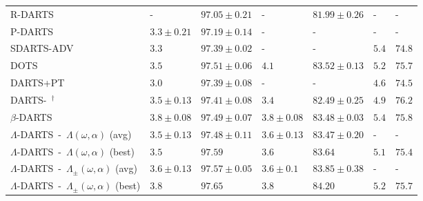 \documentclass{article} \usepackage{fancyhdr, iclr2023_conference, times}
\newcommand{\mydarts}{$\Lambda$-DARTS\xspace}
\begin{document}
\begin{table}[t]
\begin{center}
{\begin{tabular}{l l l l l l l}
\hline
R-DARTS~\citep{DBLP:conf/iclr/ZelaESMBH20} & - & $97.05\pm 0.21$ & - & $81.99\pm 0.26$ & - & - \\
P-DARTS~\citep{DBLP:conf/eccv/LiuZNSHLFYHM18} & $3.3\pm 0.21$ & $97.19\pm 0.14$ & - & - & - & - \\
SDARTS-ADV~\citep{DBLP:conf/icml/ChenH20} & $3.3$ & $97.39\pm 0.02$ & - & - & $5.4$ & $74.8$ \\
DOTS~\citep{DBLP:conf/cvpr/GuW0YWLC21} & $3.5$ & $\mathbf{97.51\pm 0.06}$ & $4.1$ & $\mathbf{83.52\pm 0.13}$ & $5.2$ & $75.7$ \\
DARTS+PT~\citep{DBLP:conf/iclr/WangCCTH21} & $3.0$ & $97.39\pm 0.08$ & - & - & $4.6$ & $74.5$ \\
DARTS-~\citep{DBLP:conf/iclr/ChuW0LWY21}$^\dagger$ & $3.5\pm0.13$ & $97.41\pm 0.08$ & $3.4$ & $82.49\pm 0.25$ & $4.9$ & $\mathbf{76.2}$ \\
$\beta$-DARTS~\citep{DBLP:journals/corr/abs-2203-01665} & $3.8\pm 0.08$ & $97.49\pm 0.07$ & $3.8\pm 0.08$ & $83.48\pm 0.03$ & $5.4$ & $75.8$\\\hline
\mydarts~-~$\Lambda(\omega, \alpha)$ (avg) & $3.5\pm 0.13$ & $97.48\pm0.11$ & $3.6\pm 0.13$ & $83.47\pm 0.20$ & - & - \\
\mydarts~-~$\Lambda(\omega, \alpha)$ (best) & $3.5$ & $97.59$ & $3.6$ & $83.64$ & $5.1$ & $75.4$ \\

\mydarts~-~$\Lambda_\pm(\omega, \alpha)$ (avg) & $3.6\pm 0.13$ & $\mathbf{97.57\pm 0.05}$ & $3.6\pm0.1$ & $\mathbf{83.85\pm0.38}$ & - & -\\
\mydarts~-~$\Lambda_\pm(\omega, \alpha)$ (best) & $3.8$ & $\mathbf{97.65}$ & $3.8$ & $\mathbf{84.20}$ & $5.2$ & $\mathbf{75.7}$\\
\end{tabular}
}
\end{center}
\end{table}
\end{document}
